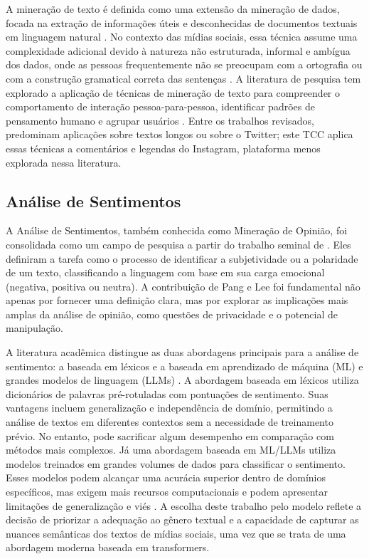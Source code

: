 A mineração de texto é definida como uma extensão da mineração de dados, focada na extração de informações úteis e desconhecidas de documentos textuais em linguagem natural \cite{irfan2015}. No contexto das mídias sociais, essa técnica assume uma complexidade adicional devido à natureza não estruturada, informal e ambígua dos dados, onde as pessoas frequentemente não se preocupam com a ortografia ou com a construção gramatical correta das sentenças \cite{irfan2015}. A literatura de pesquisa tem explorado a aplicação de técnicas de mineração de texto para compreender o comportamento de interação pessoa-para-pessoa, identificar padrões de pensamento humano e agrupar usuários \cite{irfan2015}. Entre os trabalhos revisados, predominam aplicações sobre textos longos ou sobre o Twitter; este TCC aplica essas técnicas a comentários e legendas do Instagram, plataforma menos explorada nessa literatura.

\subsection{Análise de Sentimentos}

A Análise de Sentimentos, também conhecida como Mineração de Opinião, foi consolidada como um campo de pesquisa a partir do trabalho seminal de . Eles definiram a tarefa como o processo de identificar a subjetividade ou a polaridade de um texto, classificando a linguagem com base em sua carga emocional (negativa, positiva ou neutra). A contribuição de Pang e Lee foi fundamental não apenas por fornecer uma definição clara, mas por explorar as implicações mais amplas da análise de opinião, como questões de privacidade e o potencial de manipulação.

A literatura acadêmica distingue as duas abordagens principais para a análise de sentimento: a baseada em léxicos e a baseada em aprendizado de máquina (ML) e grandes modelos de linguagem (LLMs) \cite{liu2012sentiment}. A abordagem baseada em léxicos utiliza dicionários de palavras pré-rotuladas com pontuações de sentimento. Suas vantagens incluem generalização e independência de domínio, permitindo a análise de textos em diferentes contextos sem a necessidade de treinamento prévio. No entanto, pode sacrificar algum desempenho em comparação com métodos mais complexos. Já uma abordagem baseada em ML/LLMs utiliza modelos treinados em grandes volumes de dados para classificar o sentimento. Esses modelos podem alcançar uma acurácia superior dentro de domínios específicos, mas exigem mais recursos computacionais e podem apresentar limitações de generalização e viés \cite{liu2012sentiment}. A escolha deste trabalho pelo modelo  reflete a decisão de priorizar a adequação ao gênero textual e a capacidade de capturar as nuances semânticas dos textos de mídias sociais, uma vez que se trata de uma abordagem moderna baseada em transformers.

